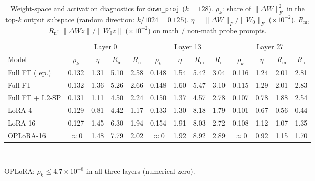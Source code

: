 \begin{table}[t]
\centering
\footnotesize
\setlength{\tabcolsep}{2.6pt}
\caption{Weight-space and activation diagnostics for \texttt{down\_proj} ($k=128$). $\rho_k$: share of $\|\Delta W\|_F^2$ in the top-$k$ output subspace (random direction: $k/1024=0.125$). $\eta=\|\Delta W\|_F/\|W_0\|_F$ ($\times10^{-2}$). $R_\mathrm{m}$, $R_\mathrm{n}$: $\|\Delta W z\|/\|W_0 z\|$ ($\times10^{-2}$) on math / non-math probe prompts.}
\label{tab:diag}
\begin{tabular}{lcccccccccccc}
\toprule
 & \multicolumn{4}{c}{Layer 0} & \multicolumn{4}{c}{Layer 13} & \multicolumn{4}{c}{Layer 27} \\
\cmidrule(lr){2-5}\cmidrule(lr){6-9}\cmidrule(lr){10-13}
Model & $\rho_k$ & $\eta$ & $R_\mathrm{m}$ & $R_\mathrm{n}$ & $\rho_k$ & $\eta$ & $R_\mathrm{m}$ & $R_\mathrm{n}$ & $\rho_k$ & $\eta$ & $R_\mathrm{m}$ & $R_\mathrm{n}$ \\
\midrule
Full FT (\textonehalf{} ep.) & 0.132 & 1.31 & 5.10 & 2.58 & 0.148 & 1.54 & 5.42 & 3.04 & 0.116 & 1.24 & 2.01 & 2.81 \\
Full FT & 0.132 & 1.36 & 5.26 & 2.66 & 0.148 & 1.60 & 5.47 & 3.10 & 0.115 & 1.29 & 2.01 & 2.83 \\
Full FT + L2-SP & 0.131 & 1.11 & 4.50 & 2.24 & 0.150 & 1.37 & 4.57 & 2.78 & 0.107 & 0.78 & 1.88 & 2.54 \\
LoRA-4 & 0.129 & 0.81 & 4.42 & 1.17 & 0.133 & 1.30 & 8.18 & 1.79 & 0.101 & 0.67 & 0.56 & 0.44 \\
LoRA-16 & 0.127 & 1.45 & 6.30 & 1.94 & 0.154 & 1.91 & 8.03 & 2.72 & 0.108 & 1.12 & 1.07 & 1.35 \\
OPLoRA-16 & $\approx 0$ & 1.48 & 7.79 & 2.02 & $\approx 0$ & 1.92 & 8.92 & 2.89 & $\approx 0$ & 0.92 & 1.15 & 1.70 \\
\bottomrule
\end{tabular}
\\[2pt]
\parbox{\linewidth}{\scriptsize OPLoRA: $\rho_k \leq 4.7\times10^{-8}$ in all three layers (numerical zero).}
\end{table}
